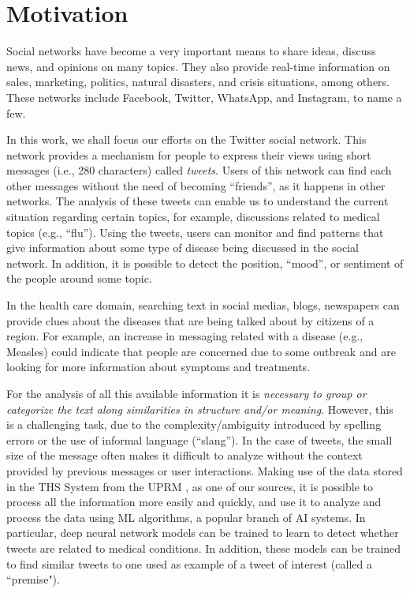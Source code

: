 \documentclass[12pt]{report}
\begin{document}
	\section{Motivation}
	Social networks have become a very important means to share ideas, discuss news, and opinions on many topics.  They also provide real-time information on sales, marketing, politics, natural disasters, and crisis situations, among others. These networks include Facebook, Twitter, WhatsApp, and Instagram, to name a few. 
	
	In this work, we shall focus our efforts on the Twitter social network. This network provides a mechanism for people to express their views using short messages (i.e., 280 characters)
	called {\em tweets}. 
	Users of this network can find each other messages without the need of becoming ``friends'', as it happens in other networks. The analysis of these tweets can enable us to understand the current situation regarding certain topics, for example, discussions related to medical topics (e.g., ``flu'').
	Using the tweets, users can monitor and find patterns that give information about some type of disease being discussed in the social network. In addition, it is possible to detect the position,
	``mood'', or sentiment of the people around some topic.

	In the health care domain, searching text in social medias, blogs, newspapers can provide clues about the diseases that are being talked about 
	by citizens of a region. For example, an increase in messaging related with a disease (e.g., Measles) could indicate that people are concerned 
	due to some outbreak and are looking for more information about symptoms and treatments. 
		
	For the analysis of all this available information it is {\em necessary to group or categorize the text along similarities in structure and/or meaning}. However, this is a challenging task, due to the complexity/ambiguity introduced by  spelling errors or the use of informal language (``slang'').  In the case of tweets, the small size of the message often makes it difficult to analyze without the context provided by previous messages or user interactions. Making use of the data stored in the  \ac{THS} System from the \ac{UPRM} , as one of our sources, it is possible to process all the information more easily and quickly, and use it to analyze and process the data using  \ac{ML} algorithms, a popular branch of \ac{AI} systems. In particular, deep neural network models can be trained to learn to detect 
	whether tweets are related to  medical conditions. In addition, these models can be trained to  find similar tweets to one used as example of a tweet
	of interest (called a ``premise").
	
\end{document}
